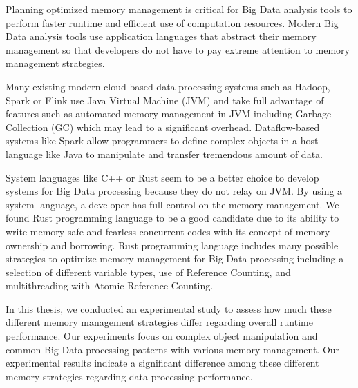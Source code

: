 

Planning optimized memory management is critical for Big Data analysis tools to
perform faster runtime and efficient use of computation resources.
Modern Big Data analysis tools use application languages that abstract their
memory management so that developers do not have to pay extreme attention
to memory management strategies.

Many existing modern cloud-based data processing systems such as Hadoop, Spark or Flink use
Java Virtual Machine (JVM) and take full advantage of features such as automated memory management in JVM
including Garbage Collection (GC) which may lead to a significant overhead.
Dataflow-based systems like Spark allow programmers to define complex objects in a
host language like Java to manipulate and transfer tremendous amount of data.


System languages like C++ or Rust seem to be a better choice to
develop systems for Big Data processing because they do not relay on JVM.
By using a system language, a developer has full control on the memory management.
We found Rust programming language to be a good candidate due to its ability to write memory-safe and
fearless concurrent codes with its concept of memory ownership and borrowing.
Rust programming language includes many possible strategies to optimize memory management for Big Data processing including
a selection of different variable types, use of Reference Counting, and multithreading with Atomic Reference Counting.

In this thesis, we conducted an experimental study to assess how much these different memory management
strategies differ regarding overall runtime performance.
Our experiments focus on complex object manipulation and common Big Data processing patterns
with various memory management. Our experimental results indicate a significant
difference among these different memory strategies regarding data processing performance.
